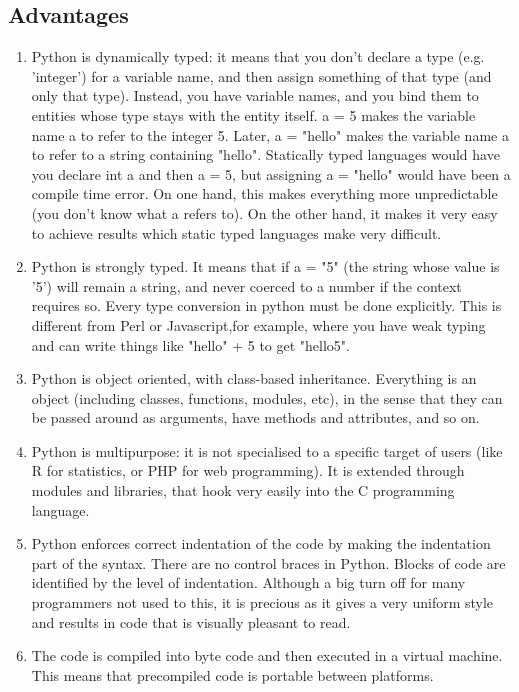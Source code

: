     \subsection{Advantages}
        \begin{enumerate}
           \item Python is dynamically typed: it means that you don't declare a type (e.g. 'integer') for a variable name, and then assign something of that type (and only that type). Instead, you have variable names, and you bind them to entities whose type stays with the entity itself. a = 5 makes the variable name a to refer to the integer 5. Later, a = "hello" makes the variable name a to refer to a string containing "hello". Statically typed languages would have you declare int a and then a = 5, but assigning a = "hello" would have been a compile time error. On one hand, this makes everything more unpredictable (you don't know what a refers to). On the other hand, it makes it very easy to achieve results which static typed languages make very difficult.
           \item Python is strongly typed. It means that if a = "5" (the string whose value is '5') will remain a string, and never coerced to a number if the context requires so. Every type conversion in python must be done explicitly. This is different from Perl or Javascript,for example, where you have weak typing and can write things like "hello" + 5 to get "hello5".
           \item Python is object oriented, with class-based inheritance. Everything is an object (including classes, functions, modules, etc), in the sense that they can be passed around as arguments, have methods and attributes, and so on.
           \item Python is multipurpose: it is not specialised to a specific target of users (like R for statistics, or PHP for web programming). It is extended through modules and libraries, that hook very easily into the C programming language.
           \item Python enforces correct indentation of the code by making the indentation part of the syntax. There are no control braces in Python. Blocks of code are identified by the level of indentation. Although a big turn off for many programmers not used to this, it is precious as it gives a very uniform style and results in code that is visually pleasant to read.
           \item The code is compiled into byte code and then executed in a virtual machine. This means that precompiled code is portable between platforms.
        \end{enumerate}

